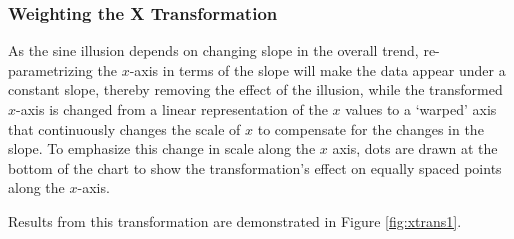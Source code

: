 \documentclass[11pt]{isuthesis}\usepackage[]{graphicx}\usepackage[]{color}
\begin{document}
\subsubsection{Weighting the X Transformation}
 As the sine illusion depends on changing slope in the overall trend,  re-parametrizing the $x$-axis in terms of the slope will make the data  appear under a  constant slope, thereby removing the effect of the illusion, while the transformed $x$-axis is changed from a linear representation of the $x$ values to a `warped' axis that continuously changes the scale of $x$ to compensate for the changes in the slope.
 To emphasize this change in scale along the $x$ axis,  dots are drawn at  the bottom of the chart  to show the transformation's effect on equally spaced points along the $x$-axis.   

Results from this transformation are demonstrated in Figure \ref{fig:xtrans1}.
 
\end{document}
